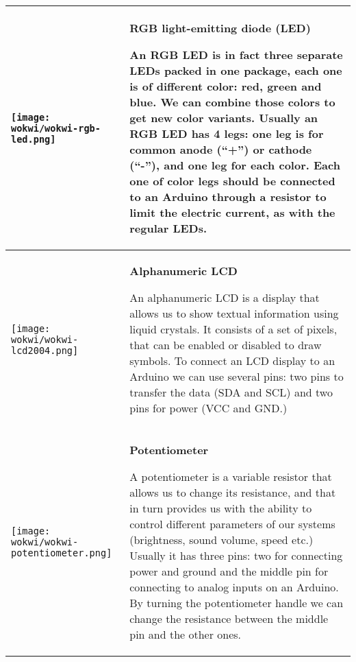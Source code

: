 \documentclass[../sparc.tex]{subfiles}
\begin{document}
\begin{longtable}{|>{
      \centering\arraybackslash
    }p{3cm}|>{
      \centering\arraybackslash}p{8cm}|
  }
  \parbox[t][3,6cm][c]{2cm}{\centering \vspace{1cm}
    \texttt{[image: wokwi/wokwi-rgb-led.png]}} &
  \parbox[t][5.1cm][t]{8cm}{
    \centering \textbf{RGB light-emitting diode (LED)}\\ \raggedright

    An RGB LED is in fact three separate LEDs packed in one package, each one is
    of different color: red, green and blue.  We can combine those colors to get
    new color variants.  Usually an RGB LED has 4 legs: one leg is for common
    anode (``+'') or cathode (``-''), and one leg for each color.  Each one of
    color legs should be connected to an Arduino through a resistor to limit the
    electric current, as with the regular LEDs.

  } \\  \hline

  \parbox[t][2,8cm][c]{2cm}{\centering \vspace{1cm}
    \texttt{[image: wokwi/wokwi-lcd2004.png]}} &
  \parbox[t][4.3cm][t]{8cm}{
    \centering \textbf{Alphanumeric LCD}\\ \raggedright

    An alphanumeric LCD is a display that allows us to show textual information
    using liquid crystals.  It consists of a set of pixels, that can be enabled
    or disabled to draw symbols.  To connect an LCD display to an Arduino we can
    use several pins: two pins to transfer the data (SDA and SCL) and two pins
    for power (VCC and GND.)

  } \\  \hline

  \parbox[t][2,5cm][c]{2cm}{\centering \vspace{1cm}
    \texttt{[image: wokwi/wokwi-potentiometer.png]}} &
  \parbox[t][4.3cm][t]{8cm}{
    \centering \textbf{Potentiometer}\\ \raggedright

    A potentiometer is a variable resistor that allows us to change its
    resistance, and that in turn provides us with the ability to control
    different parameters of our systems (brightness, sound volume, speed etc.)
    Usually it has three pins: two for connecting power and ground and the
    middle pin for connecting to analog inputs on an Arduino.  By turning the
    potentiometer handle we can change the resistance between the middle pin and
    the other ones.

  } \\  \hline


\end{longtable}
\end{document}
